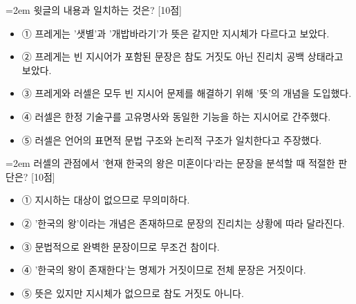 \documentclass[10pt,a4paper]{article}
\newcommand{\qnum}[1]{%
  \tikz[baseline=(num.base)]{%
    \node[circle, fill=numCircle, text=white, inner sep=0pt,
          minimum size=18pt, font=\small\bfseries] (num) {#1};%
  }%
}
\newcommand{\pts}[1]{%
  \hfill\textcolor{ptsBadge}{[#1점]}%
}
\begin{document}
\begin{minipage}{\columnwidth}
{\hangindent=2em
\qnum{25}\enspace 윗글의 내용과 일치하는 것은? \pts{10}
\par}

\vspace{3mm}
\begin{itemize}[leftmargin=2.5em, labelsep=0.3em, label={}, itemsep=4pt, parsep=1pt, topsep=0pt]
  \item ① 프레게는 '샛별'과 '개밥바라기'가 뜻은 같지만 지시체가 다르다고 보았다.
  \item ② 프레게는 빈 지시어가 포함된 문장은 참도 거짓도 아닌 진리치 공백 상태라고 보았다.
  \item ③ 프레게와 러셀은 모두 빈 지시어 문제를 해결하기 위해 '뜻'의 개념을 도입했다.
  \item ④ 러셀은 한정 기술구를 고유명사와 동일한 기능을 하는 지시어로 간주했다.
  \item ⑤ 러셀은 언어의 표면적 문법 구조와 논리적 구조가 일치한다고 주장했다.
\end{itemize}
\end{minipage}
\vspace{4mm}

\vspace{4mm}
\begin{minipage}{\columnwidth}
{\hangindent=2em
\qnum{26}\enspace 러셀의 관점에서 '현재 한국의 왕은 미혼이다'라는 문장을 분석할 때 적절한 판단은? \pts{10}
\par}

\vspace{3mm}
\begin{itemize}[leftmargin=2.5em, labelsep=0.3em, label={}, itemsep=4pt, parsep=1pt, topsep=0pt]
  \item ① 지시하는 대상이 없으므로 무의미하다.
  \item ② '한국의 왕'이라는 개념은 존재하므로 문장의 진리치는 상황에 따라 달라진다.
  \item ③ 문법적으로 완벽한 문장이므로 무조건 참이다.
  \item ④ '한국의 왕이 존재한다'는 명제가 거짓이므로 전체 문장은 거짓이다.
  \item ⑤ 뜻은 있지만 지시체가 없으므로 참도 거짓도 아니다.
\end{itemize}
\end{minipage}
\vspace{4mm}
\end{document}
